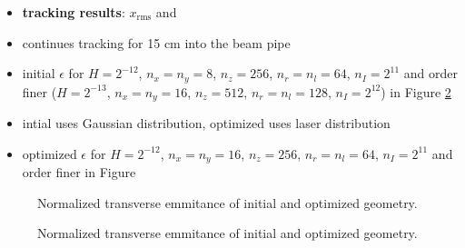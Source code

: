 \begin{itemize}
   \item \textbf{tracking results}: $x_\mathrm{rms}$ and
   \item continues tracking for 15 cm into the beam pipe
   \item initial $\epsilon$ for $H=2^{-12}$, $n_x=n_y=8$, $n_z=256$, $n_r=n_l=64$, $n_I=2^{11}$ and order finer ($H=2^{-13}$, $n_x=n_y=16$, $n_z=512$, $n_r=n_l=128$, $n_I=2^{12}$) in Figure \ref{fig:astra_res}
   \item intial uses Gaussian distribution, optimized uses laser distribution
   \item optimized $\epsilon$ for $H=2^{-12}$, $n_x=n_y=16$, $n_z=256$, $n_r=n_l=64$, $n_I=2^{11}$ and order finer in Figure
\end{itemize}

\begin{center}
\begin{figure}[H]
   \begin{subfigure}{0.4\textwidth}
      
   \end{subfigure}
   \qquad \qquad \qquad
   \begin{subfigure}{0.4\textwidth}
      
   \end{subfigure}
   \caption{Normalized transverse emmitance of initial and optimized geometry.}
   \label{fig:astra_res}
\end{figure}
\end{center}

\begin{center}
\begin{figure}[H]
   \begin{subfigure}{0.4\textwidth}
      
   \end{subfigure}
   \qquad \qquad \qquad
   \begin{subfigure}{0.4\textwidth}
      
   \end{subfigure}
   \caption{Normalized transverse emmitance of initial and optimized geometry.}
   \label{fig:astra_res}
\end{figure}
\end{center}
